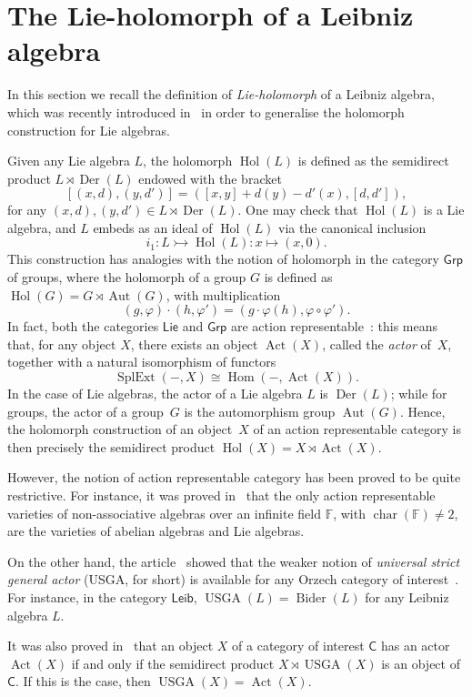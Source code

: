 \documentclass[11pt,a4paper]{amsart}
\theoremstyle{plain}
\theoremstyle{definition}
\theoremstyle{remark}
\numberwithin{equation}{section}
\newcommand{\0}{\emptyset}
\newcommand{\bC}{\mathsf{C}}
\newcommand{\bF}{\mathbb{F}}
\DeclareMathOperator{\bchar}{char}
\DeclareMathOperator{\Aut}{Aut}
\DeclareMathOperator{\Act}{Act}
\DeclareMathOperator{\Hom}{Hom}
\DeclareMathOperator{\SplExt}{SplExt}
\DeclareMathOperator{\Der}{Der}
\DeclareMathOperator{\Bider}{Bider}
\DeclareMathOperator{\hol}{Hol}
\DeclareMathOperator{\USGA}{USGA}
\newcommand{\Lie}{\ensuremath{\mathsf{Lie}}}
\newcommand{\sLeib}{\ensuremath{\mathsf{Leib}}}
\newcommand{\Grp}{\ensuremath{\mathsf{Grp}}}
\begin{document}
\section{The Lie-holomorph of a Leibniz algebra}\label{sec:holomorph}

In this section we recall the definition of \emph{Lie-holomorph} of a Leibniz algebra, which was recently introduced in~\cite{souris} in order to generalise the holomorph construction for Lie algebras.

Given any Lie algebra $L$, the holomorph $\hol(L)$ is defined as the semidirect product $L \rtimes \Der(L)$ endowed with the bracket
\[
[(x,d),(y,d')]=([x,y]+d(y)-d'(x),[d,d']),
\]
for any $(x,d),(y,d') \in L \rtimes \Der(L)$. One may check that $\hol(L)$ is a Lie algebra, and $L$ embeds as an ideal of $\hol(L)$ via the canonical inclusion
\[
i_1 \colon L \rightarrowtail \hol(L) \colon x \mapsto (x,0).
\]
This construction has analogies with the notion of holomorph in the category $\Grp$ of groups, where the holomorph of a group $G$ is defined as $\hol(G)=G \rtimes \Aut(G)$, with multiplication
\[
(g,\varphi) \cdot (h,\varphi')=(g \cdot \varphi(h),\varphi \circ \varphi').
\]
In fact, both the categories $\Lie$ and $\Grp$ are action representable~\cite{BJK2}: this means that, for any object $X$, there exists an object $\Act(X)$, called the \emph{actor} of~$X$, together with a natural isomorphism of functors
\[
\SplExt(-,X) \cong \Hom(-,\Act(X)).
\]
In the case of Lie algebras, the actor of a Lie algebra $L$ is $\Der(L)$; while for groups, the actor of a group~$G$ is the automorphism group $\Aut(G)$. Hence, the holomorph construction of an object~$X$ of an action representable category is then precisely the semidirect product $\hol(X)=X \rtimes \Act(X)$.

However, the notion of action representable category has been proved to be quite restrictive. For instance, it was proved in~\cite{tim} that the only action representable varieties of non-associative algebras over an infinite field $\bF$, with $\bchar(\bF) \neq 2$, are the varieties of abelian algebras and Lie algebras.

On the other hand, the article~\cite{casas} showed that the weaker notion of \emph{universal strict general actor} (USGA, for short) is available for any Orzech category of interest~\cite{orzech}. For instance, in the category $\sLeib$, $\USGA(L)=\Bider(L)$ for any Leibniz algebra $L$.

It was also proved in~\cite[Theorem 3.9]{casas} that an object $X$ of a category of interest $\bC$ has an actor $\Act(X)$ if and only if the semidirect product $X \rtimes \USGA(X)$ is an object of $\bC$. If this is the case, then $\USGA(X)=\Act(X)$.
\end{document}

